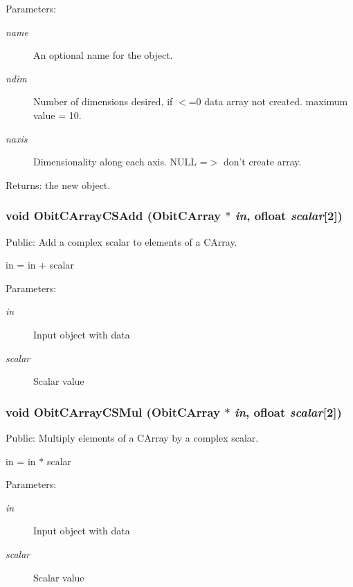 \begin{Desc}
\item[Parameters:]
\begin{description}
\item[{\em name}]An optional name for the object. \item[{\em ndim}]Number of dimensions desired, if $<$=0 data array not created. maximum value = 10. \item[{\em naxis}]Dimensionality along each axis. NULL =$>$ don't create array. \end{description}
\end{Desc}
\begin{Desc}
\item[Returns:]the new object. \end{Desc}
\subsubsection{\setlength{\rightskip}{0pt plus 5cm}void Obit\-CArray\-CSAdd ({\bf Obit\-CArray} $\ast$ {\em in}, {\bf ofloat} {\em scalar}[2])}\label{ObitCArray_8c_a20}


Public: Add a complex scalar to elements of a CArray. 

in = in + scalar \begin{Desc}
\item[Parameters:]
\begin{description}
\item[{\em in}]Input object with data \item[{\em scalar}]Scalar value \end{description}
\end{Desc}
\subsubsection{\setlength{\rightskip}{0pt plus 5cm}void Obit\-CArray\-CSMul ({\bf Obit\-CArray} $\ast$ {\em in}, {\bf ofloat} {\em scalar}[2])}\label{ObitCArray_8c_a21}


Public: Multiply elements of a CArray by a complex scalar. 

in = in $\ast$ scalar \begin{Desc}
\item[Parameters:]
\begin{description}
\item[{\em in}]Input object with data \item[{\em scalar}]Scalar value \end{description}
\end{Desc}
